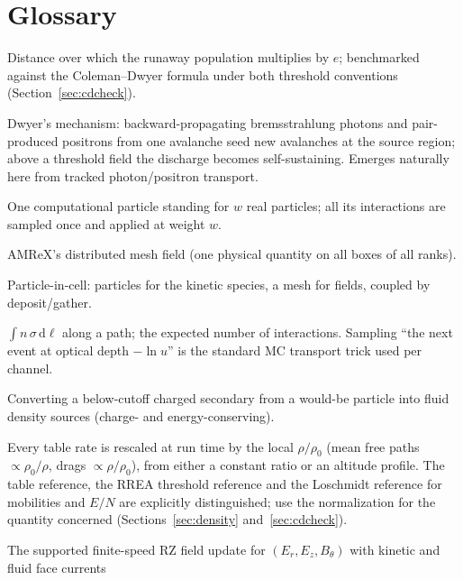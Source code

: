\documentclass[11pt]{article}
\begin{document}
\clearpage
\section{Glossary}

\begin{description}
  \setlength{\itemsep}{0.3em}\setlength{\parsep}{0pt}
  \item[Avalanche length $\lambda$] Distance over which the runaway
  population multiplies by $e$; benchmarked against the Coleman--Dwyer
  formula under both threshold conventions
  (Section~\ref{sec:cdcheck}).
  \item[Relativistic feedback] Dwyer's mechanism: backward-propagating
  bremsstrahlung photons and pair-produced positrons from one avalanche
  seed new avalanches at the source region; above a threshold field the
  discharge becomes self-sustaining. Emerges naturally here from tracked
  photon/positron transport.
  \item[Macroparticle / weight] One computational particle standing for
  $w$ real particles; all its interactions are sampled once and applied at
  weight $w$.
  \item[MultiFab] AMReX's distributed mesh field (one physical quantity on
  all boxes of all ranks).
  \item[PIC] Particle-in-cell: particles for the kinetic species, a mesh
  for fields, coupled by deposit/gather.
  \item[Optical depth] $\int n\,\sigma\,\mathrm{d}\ell$ along a path; the
  expected number of interactions. Sampling ``the next event at optical
  depth $-\ln u$'' is the standard MC transport trick used per channel.
  \item[Demotion] Converting a below-cutoff charged secondary from a
  would-be particle into fluid density sources (charge- and
  energy-conserving).
  \item[Density scaling] Every table rate is rescaled at run time by the local
  $\rho/\rho_0$ (mean free paths $\propto \rho_0/\rho$, drags
  $\propto \rho/\rho_0$), from either a constant ratio or an altitude profile.
  The table reference, the RREA threshold reference and the Loschmidt
  reference for mobilities and $E/N$ are explicitly distinguished; use the
  normalization for the quantity concerned (Sections~\ref{sec:density}
  and~\ref{sec:cdcheck}).
  \item[Maxwell TM solve] The supported finite-speed RZ field update for
  $(E_r,E_z,B_\theta)$ with kinetic and fluid face currents

\end{description}
\end{document}
